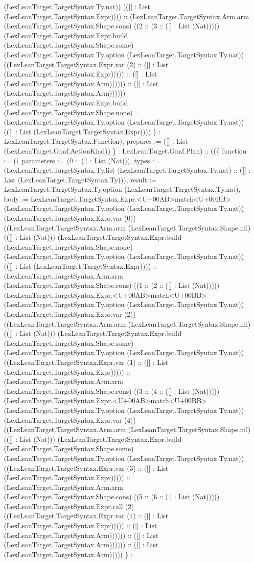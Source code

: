 \documentclass[11pt]{article}
\begin{document}
(LexLeanTarget.TargetSyntax.Ty.nat)) (([] : List (LexLeanTarget.TargetSyntax.Expr)))) :: (LexLeanTarget.TargetSyntax.Arm.arm (LexLeanTarget.TargetSyntax.Shape.cons) ((2 :: (3 :: ([] : List (Nat))))) (LexLeanTarget.TargetSyntax.Expr.build (LexLeanTarget.TargetSyntax.Shape.some) (LexLeanTarget.TargetSyntax.Ty.option (LexLeanTarget.TargetSyntax.Ty.nat)) ((LexLeanTarget.TargetSyntax.Expr.var (2) :: ([] : List (LexLeanTarget.TargetSyntax.Expr))))) :: ([] : List (LexLeanTarget.TargetSyntax.Arm)))))) :: ([] : List (LexLeanTarget.TargetSyntax.Arm)))))) (LexLeanTarget.TargetSyntax.Expr.build (LexLeanTarget.TargetSyntax.Shape.none) (LexLeanTarget.TargetSyntax.Ty.option (LexLeanTarget.TargetSyntax.Ty.nat)) (([] : List (LexLeanTarget.TargetSyntax.Expr)))) \} : LexLeanTarget.TargetSyntax.Function), prepares := ([] : List (LexLeanTarget.Gnaf.ActionKind)) \} : LexLeanTarget.Gnaf.Plan) :: ((\{ function := (\{ parameters := (0 :: ([] : List (Nat))), types := (LexLeanTarget.TargetSyntax.Ty.list (LexLeanTarget.TargetSyntax.Ty.nat) :: ([] : List (LexLeanTarget.TargetSyntax.Ty))), result := LexLeanTarget.TargetSyntax.Ty.option (LexLeanTarget.TargetSyntax.Ty.nat), body := LexLeanTarget.TargetSyntax.Expr.<U+00AB>match<U+00BB> (LexLeanTarget.TargetSyntax.Ty.option (LexLeanTarget.TargetSyntax.Ty.nat)) (LexLeanTarget.TargetSyntax.Expr.var (0)) ((LexLeanTarget.TargetSyntax.Arm.arm (LexLeanTarget.TargetSyntax.Shape.nil) (([] : List (Nat))) (LexLeanTarget.TargetSyntax.Expr.build (LexLeanTarget.TargetSyntax.Shape.none) (LexLeanTarget.TargetSyntax.Ty.option (LexLeanTarget.TargetSyntax.Ty.nat)) (([] : List (LexLeanTarget.TargetSyntax.Expr)))) :: (LexLeanTarget.TargetSyntax.Arm.arm (LexLeanTarget.TargetSyntax.Shape.cons) ((1 :: (2 :: ([] : List (Nat))))) (LexLeanTarget.TargetSyntax.Expr.<U+00AB>match<U+00BB> (LexLeanTarget.TargetSyntax.Ty.option (LexLeanTarget.TargetSyntax.Ty.nat)) (LexLeanTarget.TargetSyntax.Expr.var (2)) ((LexLeanTarget.TargetSyntax.Arm.arm (LexLeanTarget.TargetSyntax.Shape.nil) (([] : List (Nat))) (LexLeanTarget.TargetSyntax.Expr.build (LexLeanTarget.TargetSyntax.Shape.some) (LexLeanTarget.TargetSyntax.Ty.option (LexLeanTarget.TargetSyntax.Ty.nat)) ((LexLeanTarget.TargetSyntax.Expr.var (1) :: ([] : List (LexLeanTarget.TargetSyntax.Expr))))) :: (LexLeanTarget.TargetSyntax.Arm.arm (LexLeanTarget.TargetSyntax.Shape.cons) ((3 :: (4 :: ([] : List (Nat))))) (LexLeanTarget.TargetSyntax.Expr.<U+00AB>match<U+00BB> (LexLeanTarget.TargetSyntax.Ty.option (LexLeanTarget.TargetSyntax.Ty.nat)) (LexLeanTarget.TargetSyntax.Expr.var (4)) ((LexLeanTarget.TargetSyntax.Arm.arm (LexLeanTarget.TargetSyntax.Shape.nil) (([] : List (Nat))) (LexLeanTarget.TargetSyntax.Expr.build (LexLeanTarget.TargetSyntax.Shape.some) (LexLeanTarget.TargetSyntax.Ty.option (LexLeanTarget.TargetSyntax.Ty.nat)) ((LexLeanTarget.TargetSyntax.Expr.var (3) :: ([] : List (LexLeanTarget.TargetSyntax.Expr))))) :: (LexLeanTarget.TargetSyntax.Arm.arm (LexLeanTarget.TargetSyntax.Shape.cons) ((5 :: (6 :: ([] : List (Nat))))) (LexLeanTarget.TargetSyntax.Expr.call (2) ((LexLeanTarget.TargetSyntax.Expr.var (4) :: ([] : List (LexLeanTarget.TargetSyntax.Expr))))) :: ([] : List (LexLeanTarget.TargetSyntax.Arm)))))) :: ([] : List (LexLeanTarget.TargetSyntax.Arm)))))) :: ([] : List (LexLeanTarget.TargetSyntax.Arm))))) \} : 
\end{document}
